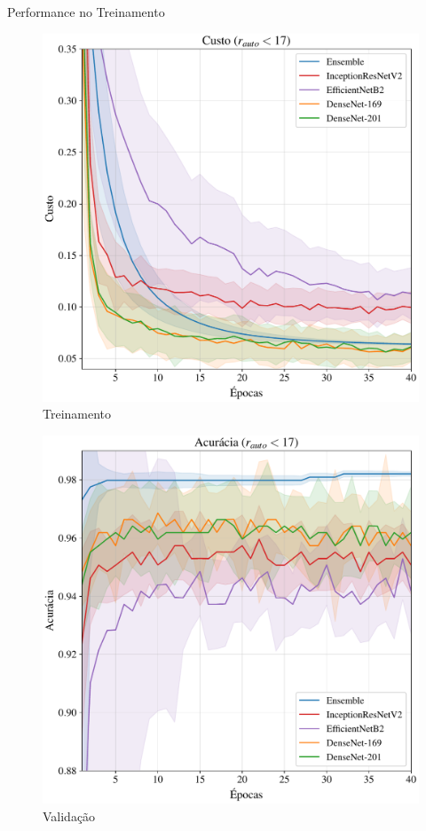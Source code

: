 \documentclass[10pt,xcolor=svgnames]{beamer}
\begin{document}
\begin{frame}{Performance no Treinamento}
  \begin{minipage}{0.48\textwidth}
    \begin{figure}
      \includegraphics[width=\linewidth]{figures/loss_170.pdf}
      \caption{Treinamento}
    \end{figure}
  \end{minipage}\hfill
  \begin{minipage}{0.48\textwidth}
    \begin{figure}
      \includegraphics[width=\linewidth]{figures/val_acc_170.pdf}
      \caption{Validação}
    \end{figure}
  \end{minipage}
\end{frame}
\end{document}
